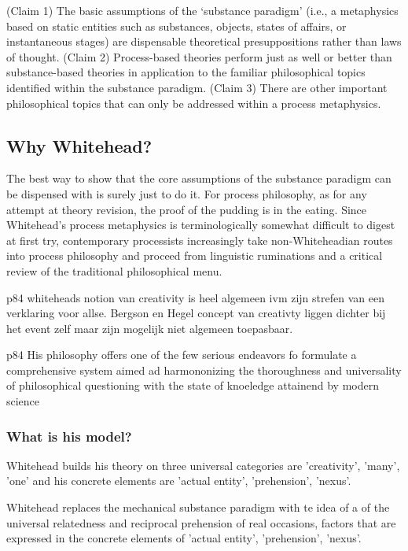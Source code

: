 (Claim 1) The basic assumptions of the ‘substance paradigm’ (i.e., a metaphysics based on static entities such as substances, objects, states of affairs, or instantaneous stages) are dispensable theoretical presuppositions rather than laws of thought.
(Claim 2) Process-based theories perform just as well or better than substance-based theories in application to the familiar philosophical topics identified within the substance paradigm.
(Claim 3) There are other important philosophical topics that can only be addressed within a process metaphysics.

\subsection{Why Whitehead?}
The best way to show that the core assumptions of the substance paradigm can be dispensed with is surely just to do it. For process philosophy, as for any attempt at theory revision, the proof of the pudding is in the eating. Since Whitehead's process metaphysics is terminologically somewhat difficult to digest at first try, contemporary processists increasingly take non-Whiteheadian routes into process philosophy and proceed from linguistic ruminations and a critical review of
 the traditional philosophical menu.

p84 
whiteheads notion van creativity is heel algemeen ivm zijn strefen van een verklaring voor allse. Bergson en Hegel concept van creativty liggen dichter bij het event zelf maar zijn mogelijk niet algemeen toepasbaar.
 
p84
His philosophy offers one of the few serious endeavors fo formulate a comprehensive  system aimed ad harmononizing the thoroughness and universality of philosophical questioning with the state of knoeledge attainend by modern science \cite[p84]{rapp1990whitehead}
 
\subsubsection{What is his model?}
\cite{whitehead1929process}
Whitehead builds his theory on three universal categories are 'creativity', 'many', 'one' and his concrete elements are 'actual entity', 'prehension', 'nexus'.


Whitehead replaces the mechanical substance paradigm with te idea of a of 
the universal relatedness and reciprocal prehension of real occasions, factors that are expressed in the concrete elements of 'actual entity', 'prehension', 'nexus'.


